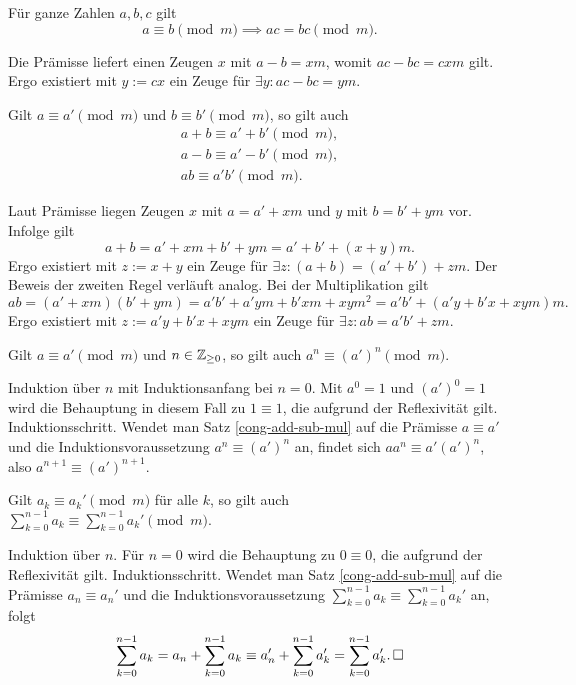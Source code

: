 \begin{Satz}\label{cong-scale}
Für ganze Zahlen $a,b,c$ gilt
\[a\equiv b\pmod m\implies ac=bc\pmod m.\]
\end{Satz}
\begin{Beweis} Die Prämisse liefert einen Zeugen $x$ mit
$a-b = xm$, womit $ac-bc = cxm$ gilt. Ergo existiert mit $y:=cx$ ein Zeuge
für $\exists y\colon ac-bc = ym$.\,\qedsymbol
\end{Beweis}

\begin{Satz}\label{cong-add-sub-mul}
Gilt $a\equiv a'\pmod m$ und $b\equiv b'\pmod m$,
so gilt auch
\begin{gather*}
a+b\equiv a'+b'\pmod m,\\
a-b\equiv a'-b'\pmod m,\\
ab\equiv a'b'\pmod m.
\end{gather*}
\end{Satz}
\begin{Beweis}
Laut Prämisse liegen Zeugen $x$ mit $a=a'+xm$ und $y$ mit $b=b'+ym$ vor.
Infolge gilt
\[a+b = a'+xm+b'+ym = a'+b'+(x+y)m.\]
Ergo existiert mit $z:=x+y$ ein Zeuge für
$\exists z\colon (a+b)=(a'+b')+zm$. Der Beweis der zweiten Regel
verläuft analog. Bei der Multiplikation gilt
\[ab = (a'+xm)(b'+ym) = a'b' + a'ym+b'xm + xym^2
= a'b' + (a'y+b'x+xym)m.\]
Ergo existiert mit $z:=a'y+b'x+xym$ ein Zeuge für
$\exists z\colon ab = a'b'+zm$.\,\qedsymbol
\end{Beweis}

\begin{Satz}\label{cong-pow}
Gilt $a\equiv a'\pmod m$ und $n\in\mathbb Z_{\ge 0}$, so gilt auch
$a^n\equiv (a')^n\pmod m$.
\end{Satz}
\begin{Beweis}
Induktion über $n$ mit Induktionsanfang bei $n=0$. Mit $a^0=1$ und
$(a')^0=1$ wird die Behauptung in diesem Fall zu $1\equiv 1$, die
aufgrund der Reflexivität gilt. Induktionsschritt.
Wendet man Satz \ref{cong-add-sub-mul} auf die Prämisse
$a\equiv a'$ und die Induktionsvoraussetzung $a^n\equiv (a')^n$
an, findet sich $aa^n \equiv a'(a')^n$, also
$a^{n+1}\equiv (a')^{n+1}$.\,\qedsymbol
\end{Beweis}

\begin{Satz}\label{cong-sum}
Gilt $a_k\equiv a_k'\pmod m$ für alle $k$, so gilt auch\\
$\sum_{k=0}^{n-1} a_k\equiv \sum_{k=0}^{n-1} a_k'\pmod m$.
\end{Satz}
\begin{Beweis}
Induktion über $n$. Für $n=0$ wird die Behauptung zu $0\equiv 0$, die
aufgrund der Reflexivität gilt. Induktionsschritt. Wendet man Satz
\ref{cong-add-sub-mul} auf die
Prämisse $a_n\equiv a_n'$ und die Induktionsvoraussetzung
$\sum_{k=0}^{n-1} a_k\equiv \sum_{k=0}^{n-1} a_k'$ an, folgt
\[\sum_{k=0}^{n-1} a_k = a_n + \sum_{k=0}^{n-1} a_k\equiv a_n' + \sum_{k=0}^{n-1} a_k'
= \sum_{k=0}^{n-1} a_k'.\,\square\]
\end{Beweis}

